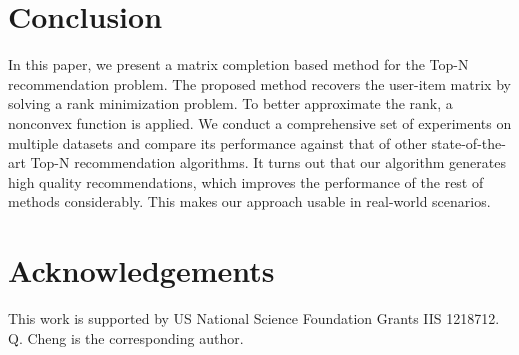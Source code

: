 \documentclass[letterpaper]{article}
\begin{document}
\section{Conclusion}
In this paper, we present a matrix completion based method for the Top-N recommendation problem. The proposed method recovers the user-item matrix by solving a rank minimization problem. To better approximate the rank, a nonconvex function is applied. We conduct a comprehensive set of experiments on multiple datasets and compare its performance against that of other state-of-the-art Top-N recommendation algorithms. It turns out that our algorithm generates high quality recommendations, which improves the performance of the rest of methods considerably. This makes our approach usable in real-world scenarios.
\section{Acknowledgements}
This work is supported by US National Science Foundation Grants IIS 1218712. Q. Cheng is the corresponding author.  
\vfill\eject
%
%
\end{document}
